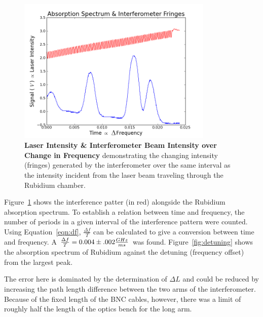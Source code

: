 \documentclass[paper=a4, fontsize=11pt]{scrartcl} %
\numberwithin{equation}{section}
\numberwithin{figure}{section}
\numberwithin{table}{section}
\begin{document}
\begin{figure}[h] \begin{center}
  \includegraphics[height=70mm]{4-1-009.png}
  \caption{\textbf{Laser Intensity \& Interferometer Beam Intensity over Change in Frequency} demonstrating the changing intensity (fringes) generated by the interferometer over the same interval as the intensity incident from the laser beam traveling through the Rubidium chamber. }
  \label{fig:int_1}
\end{center} \end{figure}

Figure~\ref{fig:int_1} shows the interference patter (in red)
alongside the Rubidium absorption spectrum. To establish a relation between time and frequency, the number of periods in a given interval of
the interference pattern were counted. Using Equation~\ref{eqn:df}, $\frac{\Delta f}{T}$ can be calculated to give a conversion
between time and frequency. A $\frac{\Delta f}{T} = 0.004 \pm
.002\frac{\normalfont{GHz}}{\normalfont{ms}}$ was found. Figure~\ref{fig:detuning}
shows the absorption spectrum of Rubidium against the detuning (frequency offset) from
the largest peak. 

The error here is dominated by the determination of $\Delta L$ and
could be reduced by increasing the path length difference between the two arms of the interferometer. Because of the fixed length of the BNC
cables, however, there was a limit of roughly half the length of the optics bench for the long arm.  
\end{document}
